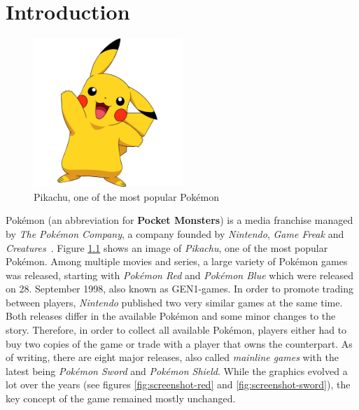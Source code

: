 
\chapter{Introduction}
\label{ch:introduction}

\begin{figure}
    \begin{center}
      \includegraphics[width=0.5\textwidth]{images/pikachu.png}
    \end{center}
    \caption{Pikachu, one of the most popular Pokémon~\autocite{Fandom:AshsPikachu}}
    \label{fig:pikachu-image}
\end{figure}
Pokémon (an abbreviation for \textbf{Pocket Monsters}) is a media franchise managed by \textit{The Pokémon Company}, a company
founded by \textit{Nintendo}, \textit{Game Freak} and \textit{Creatures}~\autocite{Wikipedia:Pokemon}. Figure \ref{fig:pikachu-image} shows an image of
\textit{Pikachu}, one of the most popular Pokémon. Among multiple movies and series, a large variety of Pokémon games was released, starting with
\textit{Pokémon Red} and \textit{Pokémon Blue} which were released on 28. September 1998, also known as \ac{GEN1}-games. In order to promote
trading between players, \textit{Nintendo} published two very similar games at the same time. 
Both releases differ in the available Pokémon and some minor changes to the story. Therefore, in order to collect all available Pokémon,
players either had to buy two copies of the game or trade with a player that owns the counterpart. As of writing, there are eight major
releases, also called \textit{mainline games} with the latest being \textit{Pokémon Sword} and \textit{Pokémon Shield}. While the graphics
evolved a lot over the years (see figures \ref{fig:screenshot-red} and \ref{fig:screenshot-sword}), the key concept of the 
game remained mostly unchanged. 
